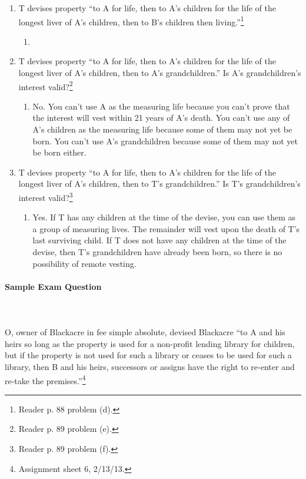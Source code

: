 \begin{enumerate}
    children's interest valid?\footnote{Reader p. 88 problem (c).}
    \begin{enumerate}
        \item Yes. Use B as the measuring life. B's children's interest will 
        vest upon his death. This is a class gift, but it is valid because the 
        class closes upon B's death.
    \end{enumerate}
    \item T devises property ``to A for life, then to A's children for the 
    life of the longest liver of A's children, then to B's children then 
    living.''\footnote{Reader p. 88 problem (d).}
    \begin{enumerate}
        \item %
    \end{enumerate}
    \item T devises property ``to A for life, then to A's children for the 
    life of the longest liver of A's children, then to A's grandchildren.'' Is 
    A's grandchildren's interest valid?\footnote{Reader p. 89 problem (e).}
    \begin{enumerate}
        \item No. You can't use A as the measuring life because you can't 
        prove that the interest will vest within 21 years of A's death. You 
        can't use any of A's children as the measuring life because some of 
        them may not yet be born. You can't use A's grandchildren because 
        some of them may not yet be born either.
    \end{enumerate}
    \item T devises property ``to A for life, then to A's children for the 
    life of the longest liver of A's children, then to T's grandchildren.'' Is 
    T's grandchildren's interest valid?\footnote{Reader p. 89 problem (f).}
    \begin{enumerate}
        \item Yes. If T has any children at the time of the devise, you can 
        use them as a group of measuring lives. The remainder will vest upon 
        the death of T's last surviving child. If T does not have any children 
        at the time of the devise, then T's grandchildren have already been 
        born, so there is no possibility of remote vesting.
    \end{enumerate}
\end{enumerate}

\paragraph{Sample Exam Question}
~\\\\
O, owner of Blackacre in fee simple absolute, devised Blackacre ``to A and his 
heirs so long as the property is used for a non-profit lending library for 
children, but if the property is not used for such a library or ceases to be 
used for such a library, then B and his heirs, successors or assigns have the 
right to re-enter and re-take the premises.''\footnote{Assignment sheet 6, 
2/13/13.}

